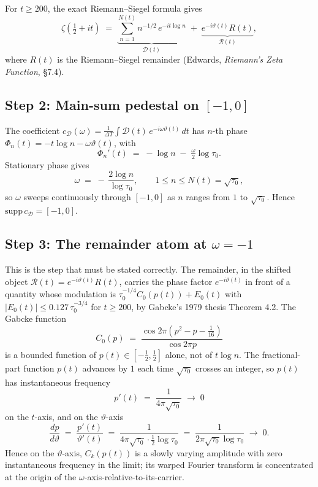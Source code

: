 \documentclass[11pt]{article}
\begin{document}
For $t\ge 200$, the exact Riemann--Siegel formula gives
\[
  \zeta(\tfrac12+it)
  \;=\; \underbrace{\sum_{n=1}^{N(t)} n^{-1/2}\,e^{-it\log n}}_{\mathcal D(t)}
  \;+\; \underbrace{e^{-i\vartheta(t)}R(t)}_{\mathcal R(t)},
\]
where $R(t)$ is the Riemann--Siegel remainder (Edwards, \emph{Riemann's Zeta Function}, \S7.4).

\subsection*{Step 2: Main-sum pedestal on $[-1,0]$}

The coefficient $c_{\mathcal D}(\omega) = \frac{1}{\Delta T}\int \mathcal D(t)\,e^{-i\omega\vartheta(t)}\,dt$ has $n$-th phase $\Phi_{n}(t) = -t\log n - \omega\vartheta(t)$, with
\[
  \Phi_{n}'(t) \;=\; -\log n \;-\; \tfrac{\omega}{2}\log\tau_{0}.
\]
Stationary phase gives
\[
  \omega \;=\; -\,\frac{2\log n}{\log\tau_{0}}, \qquad 1\le n\le N(t)=\sqrt{\tau_{0}},
\]
so $\omega$ sweeps continuously through $[-1,0]$ as $n$ ranges from $1$ to $\sqrt{\tau_{0}}$. Hence $\mathrm{supp}\,c_{\mathcal D} = [-1,0]$.

\subsection*{Step 3: The remainder atom at $\omega=-1$}

This is the step that must be stated correctly. The remainder, in the shifted object $\mathcal R(t)=e^{-i\vartheta(t)}R(t)$, carries the phase factor $e^{-i\vartheta(t)}$ in front of a quantity whose modulation is $\tau_{0}^{-1/4}C_{0}(p(t))+E_{0}(t)$ with $|E_{0}(t)|\le 0.127\,\tau_{0}^{-3/4}$ for $t\ge 200$, by Gabcke's 1979 thesis Theorem 4.2. The Gabcke function
\[
  C_{0}(p) \;=\; \frac{\cos 2\pi(p^{2}-p-\tfrac{1}{16})}{\cos 2\pi p}
\]
is a bounded function of $p(t)\in[-\tfrac12,\tfrac12]$ alone, not of $t\log n$. The fractional-part function $p(t)$ advances by $1$ each time $\sqrt{\tau_{0}}$ crosses an integer, so $p(t)$ has instantaneous frequency
\[
  p'(t) \;=\; \frac{1}{4\pi\sqrt{\tau_{0}}} \;\to\; 0
\]
on the $t$-axis, and on the $\vartheta$-axis
\[
  \frac{dp}{d\vartheta} \;=\; \frac{p'(t)}{\vartheta'(t)}
  \;=\; \frac{1}{4\pi\sqrt{\tau_{0}}\cdot\tfrac12\log\tau_{0}}
  \;=\; \frac{1}{2\pi\sqrt{\tau_{0}}\log\tau_{0}}
  \;\to\; 0.
\]
Hence on the $\vartheta$-axis, $C_{k}(p(t))$ is a slowly varying amplitude with zero instantaneous frequency in the limit; its warped Fourier transform is concentrated at the origin of the $\omega$-axis-relative-to-its-carrier.
\end{document}
